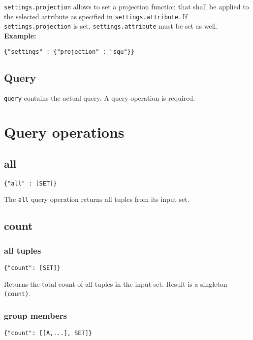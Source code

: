 \documentclass[a4paper]{article}
\begin{document}
\verb|settings.projection| allows to set a projection function that
shall be applied to the selected attribute as specified in
\verb|settings.attribute|. If \verb|settings.projection| is set,
\verb|settings.attribute| must be set as well. \\

\textbf{Example:}
\begin{verbatim}
{"settings" : {"projection" : "squ"}}
\end{verbatim}

\subsection{Query}

\verb|query| contains the actual query. A query operation is required.

\section{Query operations}

\subsection{all}

\begin{verbatim}
{"all" : [SET]}
\end{verbatim}

The \verb|all| query operation returns all tuples from its input set.

\subsection{count}

\subsubsection{all tuples}

\begin{verbatim}
{"count": [SET]}
\end{verbatim}

Returns the total count of all tuples in the input set. Result is a
singleton \verb|(count)|.

\subsubsection{group members}

\begin{verbatim}
{"count": [[A,...], SET]}
\end{verbatim}
\end{document}
